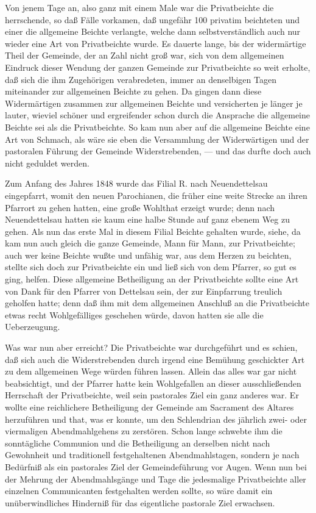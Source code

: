 Von jenem Tage an, also ganz mit einem Male war die Privatbeichte die herrschende, so daß Fälle vorkamen, daß ungefähr 100 privatim beichteten und einer die allgemeine Beichte verlangte, welche dann selbstverständlich auch nur wieder eine Art von Privatbeichte wurde. Es dauerte lange, bis der widermärtige Theil der Gemeinde, der an Zahl nicht groß war, sich von dem allgemeinen Eindruck dieser Wendung der ganzen Gemeinde zur Privatbeichte so weit erholte, daß sich die ihm Zugehörigen verabredeten, immer an denselbigen Tagen miteinander zur allgemeinen Beichte zu gehen. Da gingen dann diese Widermärtigen zusammen zur allgemeinen Beichte und versicherten je länger je lauter, wieviel schöner und ergreifender schon durch die Ansprache die allgemeine Beichte sei als die Privatbeichte. So kam nun aber auf die allgemeine
Beichte eine Art von Schmach, als wäre sie eben die Versammlung der Widerwärtigen und der pastoralen Führung der Gemeinde Widerstrebenden, — und das durfte doch auch nicht geduldet werden.

Zum Anfang des Jahres 1848 wurde das Filial R. nach Neuendettelsau eingepfarrt, womit den neuen Parochianen, die früher eine weite Strecke an ihren Pfarrort zu gehen hatten, eine große Wohlthat erzeigt wurde; denn nach Neuendettelsau hatten sie kaum eine halbe Stunde auf ganz ebenem Weg zu gehen. Als nun das erste Mal in diesem Filial Beichte gehalten wurde, siehe, da kam nun auch gleich die ganze Gemeinde, Mann für Mann, zur Privatbeichte; auch wer keine Beichte wußte und unfähig war, aus dem Herzen zu beichten, stellte sich doch zur Privatbeichte ein und ließ sich von dem Pfarrer, so gut es ging, helfen. Diese allgemeine Betheiligung an der Privatbeichte sollte eine Art von Dank für den Pfarrer von Dettelsau sein, der zur Einpfarrung treulich geholfen hatte; denn daß ihm mit dem allgemeinen Anschluß an die Privatbeichte etwas recht Wohlgefälliges geschehen würde, davon hatten sie alle die Ueberzeugung.

Was war nun aber erreicht? Die Privatbeichte war durchgeführt und es schien, daß sich auch die Widerstrebenden durch irgend eine Bemühung geschickter Art zu dem allgemeinen Wege würden führen lassen. Allein das alles war gar nicht beabsichtigt, und der Pfarrer hatte kein Wohlgefallen an dieser ausschließenden Herrschaft der Privatbeichte, weil sein pastorales Ziel ein ganz anderes war. Er wollte eine reichlichere Betheiligung der Gemeinde am Sacrament des Altares
herzuführen und that, was er konnte, um den Schlendrian des jährlich zwei- oder viermaligen Abendmahlgehens zu zerstören. Schon lange schwebte ihm die sonntägliche Communion und die Betheiligung an derselben nicht nach Gewohnheit und traditionell festgehaltenen Abendmahlstagen, sondern je nach Bedürfniß als ein pastorales Ziel der Gemeindeführung vor Augen. Wenn nun bei der Mehrung der Abendmahlsgänge und Tage die jedesmalige Privatbeichte aller einzelnen Communicanten festgehalten werden sollte, so wäre damit ein unüberwindliches Hinderniß für das eigentliche pastorale Ziel erwachsen.


